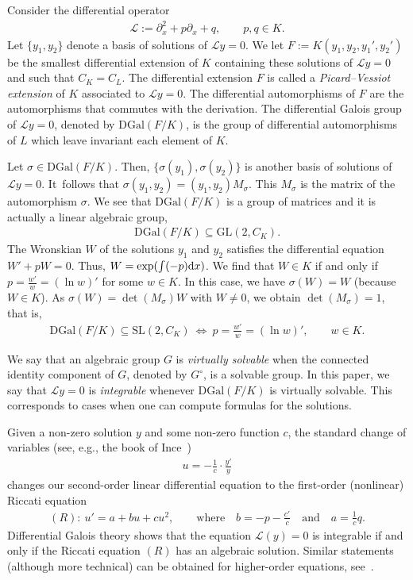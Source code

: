\documentclass[pdftex]{sigma}%
\numberwithin{equation}{section}
\begin{document}
Consider the differential operator
\begin{gather*}%
\mathcal L:=\partial_x^2 +p \partial_x +q,\qquad p,q\in K.
\end{gather*}
Let $\{ y_1,y_2\}$ denote a basis of solutions of $\mathcal Ly=0$.
We let $F:=K(y_1,y_2,y_1',y_2')$ be the smallest differential extension of $K$
containing these solutions of $\mathcal Ly=0$ and such that $C_K=C_L$.
The differential extension $F$ is called a \emph{Picard--Vessiot extension} of $K$ associated to $\mathcal Ly=0$.
The differential automorphisms of $F$ are the automorphisms that commutes with the derivation. The differential Galois group of $\mathcal Ly=0$, denoted by $\mathrm{DGal}(F/K)$, is the group of differential automorphisms of $L$ which leave invariant each element of $K$.

Let $\sigma\in \mathrm{DGal}(F/K)$. Then, $\{\sigma(y_1),\sigma(y_2)\}$ is another basis of solutions of $\mathcal Ly=0$. It~follows that
$\sigma (y_1, y_2)=(y_1,y_2)M_\sigma$. This $M_\sigma$ is the matrix of the automorphism $\sigma$.
We see that $\mathrm{DGal}(F/K)$ is a group of matrices and it is actually a linear algebraic group,
\begin{gather*}
\mathrm{DGal}(F/K) 	\subseteq \mathrm{GL}(2, C_K).
\end{gather*}
The Wronskian $W$ of the solutions $y_1$ and $y_2$
satisfies the differential equation $W'+pW=0$. Thus, $W=\exp(\int (-p){\rm d}x)$. We find that $W\in K$ if and only if $p=\frac{w'}{w}=(\ln w)'$ for some $w\in K$. In this case, we have $\sigma (W)=W$ (because $W\in K$).
As $\sigma (W)=\det(M_\sigma)W$ with $W\neq 0$, we obtain $\det(M_\sigma)=1$, that is,
\begin{gather*}
\mathrm{DGal}(F/K)\subseteq \mathrm{SL}(2, C_K) \
\Longleftrightarrow \ p=\frac{w'}{w } = (\ln w)', \qquad w\in K.
\end{gather*}

We say that an algebraic group $G$ is \emph{virtually solvable} when the connected identity component of $G$, denoted by $G^\circ$, is a solvable group. In this paper, we say that $\mathcal Ly=0$ is \emph{integrable} whenever $\mathrm{DGal}(F/K)$ is virtually solvable. This corresponds to cases when one can compute formulas for the solutions.

Given a non-zero solution $y$ and some non-zero function $c$, the standard change of variables (see, e.g., the book of Ince~\cite{in})
\begin{gather*}
u=-\frac1{c} \cdot \frac{y'}{y}
\end{gather*}
changes our second-order linear differential equation to the first-order (nonlinear) Riccati equation
\begin{gather*}
(R)\colon \ u'=a+bu+cu^2, \qquad \textrm{where}\quad b = -p - \frac{c'}{c}\quad \textrm{and}\quad a=\frac1{c} q.
\end{gather*}
Differential Galois theory shows that the equation $\mathcal{L}(y)=0$ is integrable if and only if the Riccati equation $(R)$ has an algebraic solution. Similar statements (although more technical) can be obtained for higher-order equations, see~\cite{PS}.
\end{document}
